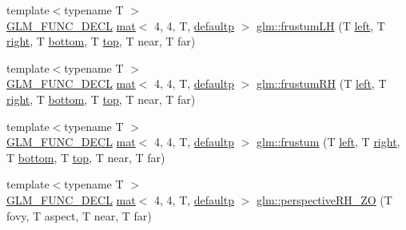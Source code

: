 \begin{DoxyCompactItemize}
\item 
{\footnotesize template$<$typename T $>$ }\\\hyperlink{setup_8hpp_ab2d052de21a70539923e9bcbf6e83a51}{G\+L\+M\+\_\+\+F\+U\+N\+C\+\_\+\+D\+E\+CL} \hyperlink{structglm_1_1mat}{mat}$<$ 4, 4, T, \hyperlink{namespaceglm_a36ed105b07c7746804d7fdc7cc90ff25a9d21ccd8b5a009ec7eb7677befc3bf51}{defaultp} $>$ \hyperlink{group__gtc__matrix__transform_gae4277c37f61d81da01bc9db14ea90296}{glm\+::frustum\+LH} (T \hyperlink{_s_d_l__opengl__glext_8h_a85b8f6c07fbc1fb5d77c2ae090f21995}{left}, T \hyperlink{_s_d_l__opengl__glext_8h_a5ffadbbacc6b89cf6218bc43b384d3fe}{right}, T \hyperlink{_s_d_l__opengl__glext_8h_a95fc257e5ddf46f7db9d5e898cdf1991}{bottom}, T \hyperlink{_s_d_l__opengl__glext_8h_a5ab323daeacf8dfdb8f91132fecdca23}{top}, T near, T far)
\item 
{\footnotesize template$<$typename T $>$ }\\\hyperlink{setup_8hpp_ab2d052de21a70539923e9bcbf6e83a51}{G\+L\+M\+\_\+\+F\+U\+N\+C\+\_\+\+D\+E\+CL} \hyperlink{structglm_1_1mat}{mat}$<$ 4, 4, T, \hyperlink{namespaceglm_a36ed105b07c7746804d7fdc7cc90ff25a9d21ccd8b5a009ec7eb7677befc3bf51}{defaultp} $>$ \hyperlink{group__gtc__matrix__transform_ga4366ab45880c6c5f8b3e8c371ca4b136}{glm\+::frustum\+RH} (T \hyperlink{_s_d_l__opengl__glext_8h_a85b8f6c07fbc1fb5d77c2ae090f21995}{left}, T \hyperlink{_s_d_l__opengl__glext_8h_a5ffadbbacc6b89cf6218bc43b384d3fe}{right}, T \hyperlink{_s_d_l__opengl__glext_8h_a95fc257e5ddf46f7db9d5e898cdf1991}{bottom}, T \hyperlink{_s_d_l__opengl__glext_8h_a5ab323daeacf8dfdb8f91132fecdca23}{top}, T near, T far)
\item 
{\footnotesize template$<$typename T $>$ }\\\hyperlink{setup_8hpp_ab2d052de21a70539923e9bcbf6e83a51}{G\+L\+M\+\_\+\+F\+U\+N\+C\+\_\+\+D\+E\+CL} \hyperlink{structglm_1_1mat}{mat}$<$ 4, 4, T, \hyperlink{namespaceglm_a36ed105b07c7746804d7fdc7cc90ff25a9d21ccd8b5a009ec7eb7677befc3bf51}{defaultp} $>$ \hyperlink{group__gtc__matrix__transform_ga0bcd4542e0affc63a0b8c08fcb839ea9}{glm\+::frustum} (T \hyperlink{_s_d_l__opengl__glext_8h_a85b8f6c07fbc1fb5d77c2ae090f21995}{left}, T \hyperlink{_s_d_l__opengl__glext_8h_a5ffadbbacc6b89cf6218bc43b384d3fe}{right}, T \hyperlink{_s_d_l__opengl__glext_8h_a95fc257e5ddf46f7db9d5e898cdf1991}{bottom}, T \hyperlink{_s_d_l__opengl__glext_8h_a5ab323daeacf8dfdb8f91132fecdca23}{top}, T near, T far)
\item 
{\footnotesize template$<$typename T $>$ }\\\hyperlink{setup_8hpp_ab2d052de21a70539923e9bcbf6e83a51}{G\+L\+M\+\_\+\+F\+U\+N\+C\+\_\+\+D\+E\+CL} \hyperlink{structglm_1_1mat}{mat}$<$ 4, 4, T, \hyperlink{namespaceglm_a36ed105b07c7746804d7fdc7cc90ff25a9d21ccd8b5a009ec7eb7677befc3bf51}{defaultp} $>$ \hyperlink{group__gtc__matrix__transform_ga4da358d6e1b8e5b9ae35d1f3f2dc3b9a}{glm\+::perspective\+R\+H\+\_\+\+ZO} (T fovy, T aspect, T near, T far)

\end{DoxyCompactItemize}
